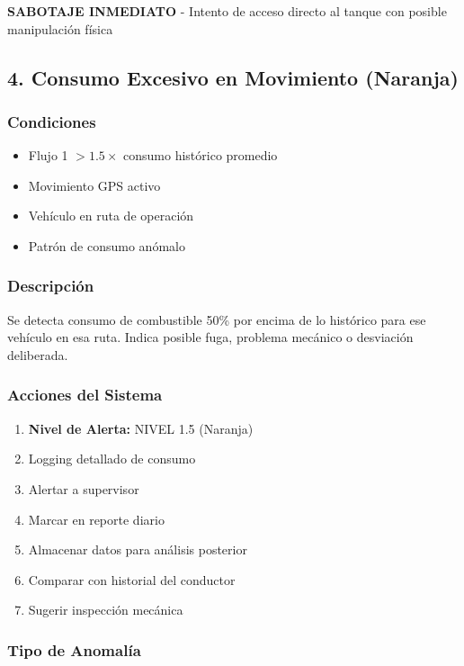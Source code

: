 \documentclass[12pt,a4paper,oneside]{report}
\begin{document}
\textbf{SABOTAJE INMEDIATO} - Intento de acceso directo al tanque con posible manipulación física

\subsection{4. Consumo Excesivo en Movimiento (Naranja)}

\subsubsection{Condiciones}

\begin{itemize}
    \item Flujo 1 $> 1.5 \times$ consumo histórico promedio
    \item Movimiento GPS activo
    \item Vehículo en ruta de operación
    \item Patrón de consumo anómalo
\end{itemize}

\subsubsection{Descripción}

Se detecta consumo de combustible 50\% por encima de lo histórico para ese vehículo en esa ruta. Indica posible fuga, problema mecánico o desviación deliberada.

\subsubsection{Acciones del Sistema}

\begin{enumerate}
    \item \textbf{Nivel de Alerta:} NIVEL 1.5 (Naranja)
    \item Logging detallado de consumo
    \item Alertar a supervisor
    \item Marcar en reporte diario
    \item Almacenar datos para análisis posterior
    \item Comparar con historial del conductor
    \item Sugerir inspección mecánica
\end{enumerate}

\subsubsection{Tipo de Anomalía}
\end{document}
